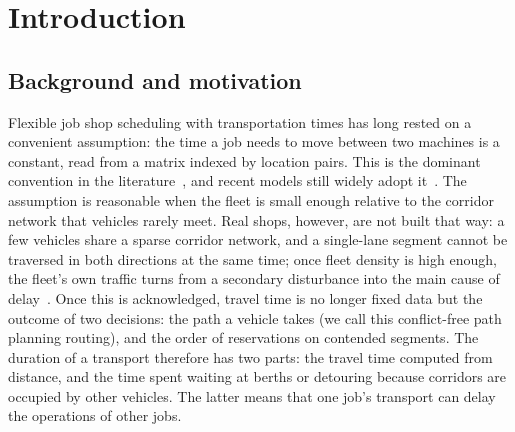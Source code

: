 \documentclass[manuscript,screen,review]{acmart}
\begin{document}
\renewcommand{\shortauthors}{Qi et al.}






\maketitle
\section{Introduction}
\label{sec:Chapter_I}

\subsection{Background and motivation}

Flexible job shop scheduling with transportation times has long rested on a convenient assumption: the time a job needs to move between two machines is a constant, read from a matrix indexed by location pairs.
This is the dominant convention in the literature~\cite{xin2025review}, and recent models still widely adopt it~\cite{meng2025cp,qin2026knowledge,jafarian2026integrated}.
The assumption is reasonable when the fleet is small enough relative to the corridor network that vehicles rarely meet.
Real shops, however, are not built that way: a few vehicles share a sparse corridor network, and a single-lane segment cannot be traversed in both directions at the same time; once fleet density is high enough, the fleet's own traffic turns from a secondary disturbance into the main cause of delay~\cite{kim2026congestion}.
Once this is acknowledged, travel time is no longer fixed data but the outcome of two decisions: the path a vehicle takes (we call this conflict-free path planning routing), and the order of reservations on contended segments.
The duration of a transport therefore has two parts: the travel time computed from distance, and the time spent waiting at berths or detouring because corridors are occupied by other vehicles. The latter means that one job's transport can delay the operations of other jobs.
\end{document}

